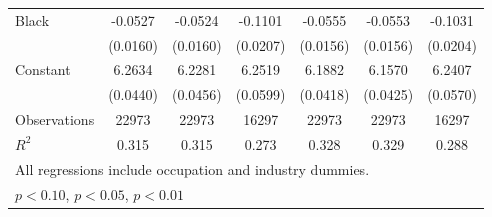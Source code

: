 {\begin{longtable}{l*{6}{c}}
Black               &     -0.0527\sym{***}&     -0.0524\sym{***}&     -0.1101\sym{***}&     -0.0555\sym{***}&     -0.0553\sym{***}&     -0.1031\sym{***}\\
                    &    (0.0160)         &    (0.0160)         &    (0.0207)         &    (0.0156)         &    (0.0156)         &    (0.0204)         \\
Constant            &      6.2634\sym{***}&      6.2281\sym{***}&      6.2519\sym{***}&      6.1882\sym{***}&      6.1570\sym{***}&      6.2407\sym{***}\\
                    &    (0.0440)         &    (0.0456)         &    (0.0599)         &    (0.0418)         &    (0.0425)         &    (0.0570)         \\
\hline  
Observations        &       22973         &       22973         &       16297         &       22973         &       22973         &       16297         \\
\(R^{2}\)           &       0.315         &       0.315         &       0.273         &       0.328         &       0.329         &       0.288         \\
\hline  
\multicolumn{7}{l}{\footnotesize All regressions include occupation and industry dummies.}\\
\multicolumn{7}{l}{\footnotesize \sym{*} \(p<0.10\), \sym{**} \(p<0.05\), \sym{***} \(p<0.01\)}\\
\end{longtable}
}

